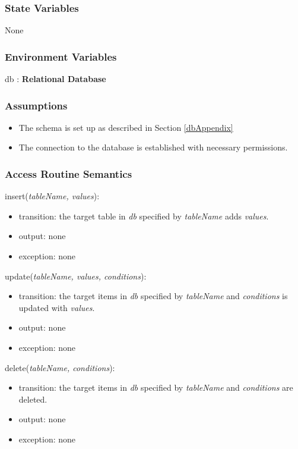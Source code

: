 \documentclass[12pt, titlepage]{article}
\begin{document}
\subsubsection{State Variables}
None

\subsubsection{Environment Variables}
db : \textbf{Relational Database} 

\subsubsection{Assumptions}
\begin{itemize}
  \item The schema is set up as described in Section \ref{dbAppendix}
  \item The connection to the database is established with necessary permissions.
\end{itemize}

\subsubsection{Access Routine Semantics}

\noindent insert(\textit{tableName, values}):
\begin{itemize}
\item transition: the target table in \textit{db} specified by \textit{tableName} adds \textit{values}.
\item output: none
\item exception: none
\end{itemize}

\noindent update(\textit{tableName, values, conditions}):
\begin{itemize}
\item transition: the target items in \textit{db} specified by \textit{tableName} and \textit{conditions} is updated with \textit{values}.
\item output: none
\item exception: none
\end{itemize}

\noindent delete(\textit{tableName, conditions}):
\begin{itemize}
\item transition: the target items in \textit{db} specified by \textit{tableName} and \textit{conditions} are deleted.
\item output: none
\item exception: none
\end{itemize}
\end{document}
